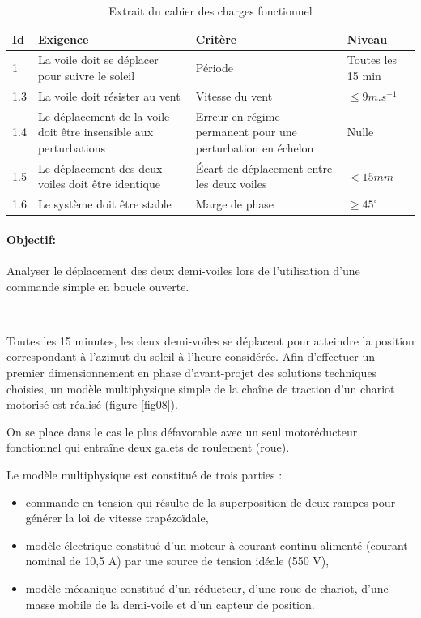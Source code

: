 
\begin{table}[ht!]
\begin{tabular}{|p{}|p{}|p{}|p{}|}
\hline
Id & Exigence & Critère & Niveau\\
\hline
1 & La voile doit se déplacer pour suivre le soleil & Période & Toutes les 15 min\\
\hline
1.3 & La voile doit résister au vent & Vitesse du vent & $\leq 9m.s^{-1}$ \\
\hline
1.4 & Le déplacement de la voile doit être insensible aux perturbations & Erreur en régime permanent pour une perturbation en échelon & Nulle \\
\hline
1.5 & Le déplacement des deux voiles doit être identique & Écart de déplacement entre les deux voiles & $< 15 mm$ \\
\hline
1.6 & Le système doit être stable & Marge de phase & $\geq 45^{\circ}$ \\
\hline
\end{tabular}
\caption{\label{tab02} Extrait du cahier des charges fonctionnel}
\end{table}
	
\paragraph{Objectif:} Analyser le déplacement des deux demi-voiles lors de l'utilisation d'une commande simple en boucle ouverte.

~\

Toutes les 15 minutes, les deux demi-voiles se déplacent pour atteindre la position correspondant à l'azimut du soleil à l'heure considérée. Afin d'effectuer un premier dimensionnement en phase d'avant-projet des solutions techniques choisies, un modèle multiphysique simple de la chaîne de traction d'un chariot motorisé est réalisé (figure \ref{fig08}).

On se place dans le cas le plus défavorable avec un seul motoréducteur fonctionnel qui entraîne deux galets de roulement (roue).


Le modèle multiphysique est constitué de trois parties :
\begin{itemize}
 \item commande en tension qui résulte de la superposition de deux rampes pour générer la loi de vitesse trapézoïdale,
 \item modèle électrique constitué d'un moteur à courant continu alimenté (courant nominal de 10,5 A) par une source de tension idéale (550 V),
 \item modèle mécanique constitué d'un réducteur, d'une roue de chariot, d'une masse mobile de la demi-voile et d'un capteur de position.
\end{itemize}


